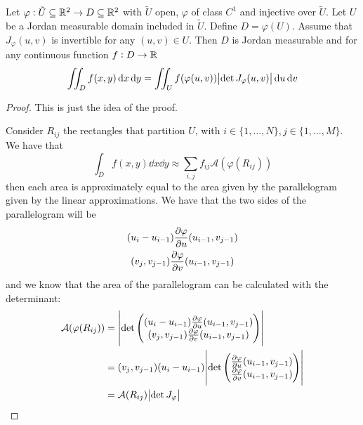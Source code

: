 \documentclass[12pt]{extarticle}
\begin{document}
\begin{theorem}
    Let $\varphi: \tilde{U} \subseteq \mathbb{R}^2 \to D \subseteq \mathbb{R}^2$ with $\tilde{U}$ open, $\varphi$ of class $C^1$ and injective over $\tilde{U}$.
    Let $U$ be a Jordan measurable domain included in $\tilde{U}$.
    Define $D = \varphi(U)$.
    Assume that $J_\varphi (u,v)$ is invertible for any $(u, v) \in U$.
    Then $D$ is Jordan measurable and for any continuous function $f:D \to \mathbb{R}$
    \begin{equation}
        \iint_D f(x, y) \dd{x}\dd{y} = \iint_U f(\varphi(u, v)) \abs{\det J_{\varphi}(u, v)} \dd{u} \dd{v}
    \end{equation}
\end{theorem}
\begin{proof}
    This is just the idea of the proof.

    Consider $R_{ij}$ the rectangles that partition $U$, with $i \in \{1, \ldots,N\}, j \in \{1, \ldots,M\}$.
    We have that
    \begin{equation}
        \int_D f(x, y) \dd{x} \dd{y} \approx \sum_{i,j} f_{ij} \mathcal A (\varphi(R_{ij}))
    \end{equation}
    then each area is approximately equal to the area given by the parallelogram given by the linear approximations.
    We have that the two sides of the parallelogram will be
    \begin{gather}
        (u_i - u_{i-1}) \pdv{\varphi}{u}()(u_{i-1}, v_{j-1}) \\
        (v_j, v_{j-1}) \pdv{\varphi}{v}()(u_{i-1}, v_{j-1})
    \end{gather}
    and we know that the area of the parallelogram can be calculated with the determinant:
    \begin{align}
        \mathcal A(\varphi(R_{ij})) & = \abs{\det \begin{pmatrix}
                                                          (u_i - u_{i-1}) \pdv{\varphi}{u}()(u_{i-1}, v_{j-1}) \\
                                                          (v_j, v_{j-1}) \pdv{\varphi}{v}()(u_{i-1}, v_{j-1})
                                                      \end{pmatrix}}               \\
                                    & = (v_j, v_{j-1})(u_i - u_{i-1}) \abs{\det \begin{pmatrix}
                                                                                        \pdv{\varphi}{u}()(u_{i-1}, v_{j-1}) \\
                                                                                        \pdv{\varphi}{v}()(u_{i-1}, v_{j-1})
                                                                                    \end{pmatrix}} \\
                                    & = \mathcal A(R_{ij}) \abs{\det J_\varphi}
    \end{align}


\end{proof}
\end{document}

